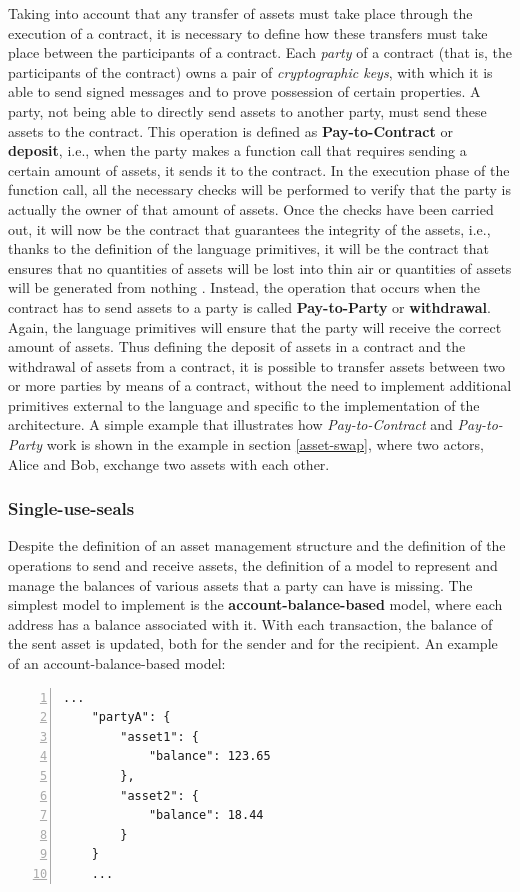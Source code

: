 Taking into account that any transfer of assets must take place through the execution of a contract, it is 
necessary to define how these transfers must take place between the participants of a contract. Each 
\textit{party} of a contract (that is, the participants of the contract) owns a pair of 
\textit{cryptographic keys}, with which it is able to send signed messages and to prove possession of 
certain properties. A party, not being able to directly send assets to another party, must send these assets 
to the contract. This operation is defined as \textbf{Pay-to-Contract} or \textbf{deposit}, i.e., when the 
party makes a function call that requires sending a certain amount of assets, it sends it to the contract. 
In the execution phase of the function call, all the necessary checks will be performed to verify that the 
party is actually the owner of that amount of assets. Once the checks have been carried out, it will now be 
the contract that guarantees the integrity of the assets, i.e., thanks to the definition of the language 
primitives, it will be the contract that ensures that no quantities of assets will be lost into thin air or 
quantities of assets will be generated from nothing . Instead, the operation that occurs when the contract 
has to send assets to a party is called \textbf{Pay-to-Party} or \textbf{withdrawal}. Again, the language 
primitives will ensure that the party will receive the correct amount of assets. Thus defining the deposit 
of assets in a contract and the withdrawal of assets from a contract, it is possible to transfer assets 
between two or more parties by means of a contract, without the need to implement additional primitives 
external to the language and specific to the implementation of the architecture. A simple example that 
illustrates how \textit{Pay-to-Contract} and \textit{Pay-to-Party} work is shown in the example in section 
\ref{asset-swap}, where two actors, Alice and Bob, exchange two assets with each other.

\subsubsection{Single-use-seals}
\label{single-use-seal-definition}

Despite the definition of an asset management structure and the definition of the operations to send and 
receive assets, the definition of a model to represent and manage the balances of various assets that a 
party can have is missing. The simplest model to implement is the \textbf{account-balance-based} model, 
where each address has a balance associated with it. With each transaction, the balance of the sent asset is 
updated, both for the sender and for the recipient. An example of an account-balance-based model:
\begin{Verbatim}[numbers=left,xleftmargin=2cm]
	...
	"partyA": {
		"asset1": {
			"balance": 123.65
		},
		"asset2": {
			"balance": 18.44
		}
	}
	...
\end{Verbatim}

